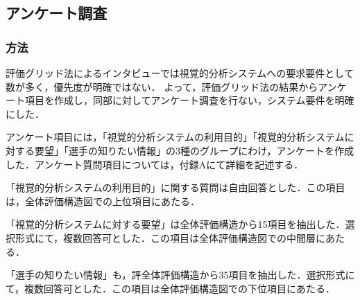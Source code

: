 \documentclass[sotsuron]{kuee}
\begin{document}
		\subsection{アンケート調査}
			\subsubsection{方法}
				評価グリッド法によるインタビューでは視覚的分析システムへの要求要件として数が多く，優先度が明確ではない．
				よって，評価グリッド法の結果からアンケート項目を作成し，同部に対してアンケート調査を行ない，システム要件を明確にした．
				
				アンケート項目には，「視覚的分析システムの利用目的」「視覚的分析システムに対する要望」「選手の知りたい情報」の3種のグループにわけ，アンケートを作成した．アンケート質問項目については，付録Aにて詳細を記述する．

				「視覚的分析システムの利用目的」に関する質問は自由回答とした．この項目は，全体評価構造図での上位項目にあたる．

				「視覚的分析システムに対する要望」は全体評価構造から15項目を抽出した．選択形式にて，複数回答可とした．この項目は全体評価構造図での中間層にあたる．

				「選手の知りたい情報」も，評全体評価構造から35項目を抽出した．選択形式にて，複数回答可とした．この項目は全体評価構造図での下位項目にあたる．
\end{document}

